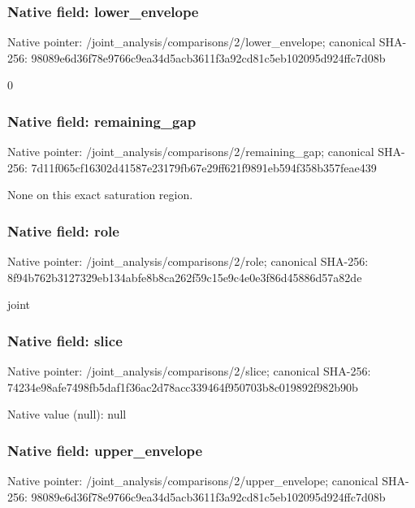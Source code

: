 \documentclass[10pt,a4paper]{article}
\begin{document}
\subsubsection{Native field: lower\_envelope}


Native pointer: /joint\_analysis/comparis\allowbreak{}ons/2/lower\_envelope; canonical SHA-256: 98089e6d36f78e9766c9ea34\allowbreak{}d5acb3611f3a92cd81c5eb10\allowbreak{}2095d924ffc7d08b


0


\subsubsection{Native field: remaining\_gap}


Native pointer: /joint\_analysis/comparis\allowbreak{}ons/2/remaining\_gap; canonical SHA-256: 7d11f065cf16302d41587e23\allowbreak{}179fb67e29ff621f9891eb59\allowbreak{}4f358b357feae439


None on this exact saturation region.


\subsubsection{Native field: role}


Native pointer: /joint\_analysis/comparisons/2/role; canonical SHA-256: 8f94b762b3127329eb134abf\allowbreak{}e8b8ca262f59c15e9c4e0e3f\allowbreak{}86d45886d57a82de


joint


\subsubsection{Native field: slice}


Native pointer: /joint\_analysis/comparisons/2/slice; canonical SHA-256: 74234e98afe7498fb5daf1f3\allowbreak{}6ac2d78acc339464f950703b\allowbreak{}8c019892f982b90b



Native value (null): null



\subsubsection{Native field: upper\_envelope}


Native pointer: /joint\_analysis/comparis\allowbreak{}ons/2/upper\_envelope; canonical SHA-256: 98089e6d36f78e9766c9ea34\allowbreak{}d5acb3611f3a92cd81c5eb10\allowbreak{}2095d924ffc7d08b
\end{document}
